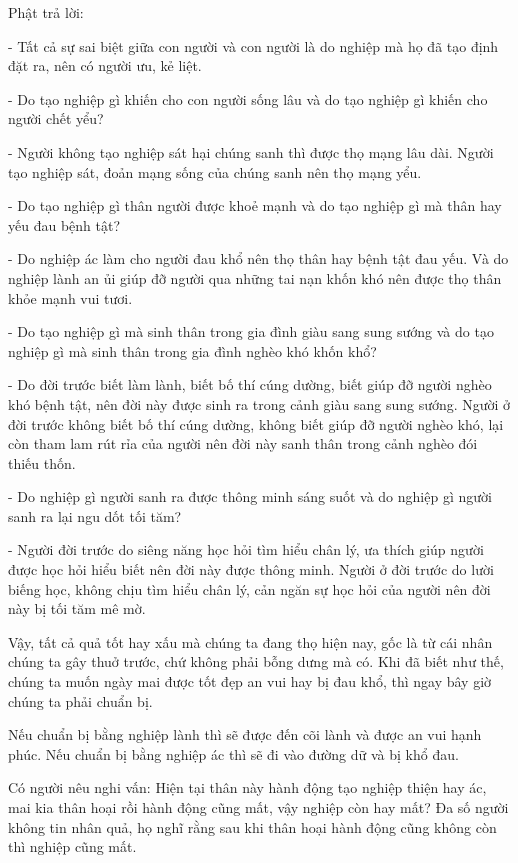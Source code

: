 \documentclass[
  12pt,
  oneside]{book}
\begin{document}
Phật trả lời:

- Tất cả sự sai biệt giữa con người và con người là do nghiệp mà họ đã tạo định đặt ra, nên có người ưu, kẻ liệt.

- Do tạo nghiệp gì khiến cho con người sống lâu và do tạo nghiệp gì khiến cho người chết yểu?

- Người không tạo nghiệp sát hại chúng sanh thì được thọ mạng lâu dài. Người tạo nghiệp sát, đoản mạng sống của chúng sanh nên thọ mạng yểu.

- Do tạo nghiệp gì thân người được khoẻ mạnh và do tạo nghiệp gì mà thân hay yếu đau bệnh tật?

- Do nghiệp ác làm cho người đau khổ nên thọ thân hay bệnh tật đau yếu. Và do nghiệp lành an ủi giúp đỡ người qua những tai nạn khốn khó nên được thọ thân khỏe mạnh vui tươi.

- Do tạo nghiệp gì mà sinh thân trong gia đình giàu sang sung sướng và do tạo nghiệp gì mà sinh thân trong gia đình nghèo khó khốn khổ?

- Do đời trước biết làm lành, biết bố thí cúng dường, biết giúp đỡ người nghèo khó bệnh tật, nên đời này được sinh ra trong cảnh giàu sang sung sướng. Người ở đời trước không biết bố thí cúng dường, không biết giúp đỡ người nghèo khó, lại còn tham lam rút rỉa của người nên đời này sanh thân trong cảnh nghèo đói thiếu thốn.

- Do nghiệp gì người sanh ra được thông minh sáng suốt và do nghiệp gì người sanh ra lại ngu dốt tối tăm?

- Người đời trước do siêng năng học hỏi tìm hiểu chân lý, ưa thích giúp người được học hỏi hiểu biết nên đời này được thông minh. Người ở đời trước do lười biếng học, không chịu tìm hiểu chân lý, cản ngăn sự học hỏi của người nên đời này bị tối tăm mê mờ.

Vậy, tất cả quả tốt hay xấu mà chúng ta đang thọ hiện nay, gốc là từ cái nhân chúng ta gây thuở trước, chứ không phải bỗng dưng mà có. Khi đã biết như thế, chúng ta muốn ngày mai được tốt đẹp an vui hay bị đau khổ, thì ngay bây giờ chúng ta phải chuẩn bị.

Nếu chuẩn bị bằng nghiệp lành thì sẽ được đến cõi lành và được an vui hạnh phúc. Nếu chuẩn bị bằng nghiệp ác thì sẽ đi vào đường dữ và bị khổ đau.

Có người nêu nghi vấn: Hiện tại thân này hành động tạo nghiệp thiện hay ác, mai kia thân hoại rồi hành động cũng mất, vậy nghiệp còn hay mất? Đa số người không tin nhân quả, họ nghĩ rằng sau khi thân hoại hành động cũng không còn thì nghiệp cũng mất.
\end{document}
